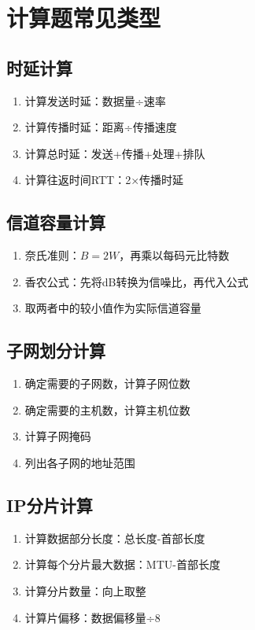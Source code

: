 \section{计算题常见类型}

\subsection{时延计算}
\begin{enumerate}[leftmargin=2em,itemsep=0pt]
    \item 计算发送时延：数据量÷速率
    \item 计算传播时延：距离÷传播速度
    \item 计算总时延：发送+传播+处理+排队
    \item 计算往返时间RTT：2×传播时延
\end{enumerate}

\subsection{信道容量计算}
\begin{enumerate}[leftmargin=2em,itemsep=0pt]
    \item 奈氏准则：$B = 2W$，再乘以每码元比特数
    \item 香农公式：先将dB转换为信噪比，再代入公式
    \item 取两者中的较小值作为实际信道容量
\end{enumerate}

\subsection{子网划分计算}
\begin{enumerate}[leftmargin=2em,itemsep=0pt]
    \item 确定需要的子网数，计算子网位数
    \item 确定需要的主机数，计算主机位数
    \item 计算子网掩码
    \item 列出各子网的地址范围
\end{enumerate}

\subsection{IP分片计算}
\begin{enumerate}[leftmargin=2em,itemsep=0pt]
    \item 计算数据部分长度：总长度-首部长度
    \item 计算每个分片最大数据：MTU-首部长度
    \item 计算分片数量：向上取整
    \item 计算片偏移：数据偏移量÷8
\end{enumerate}

